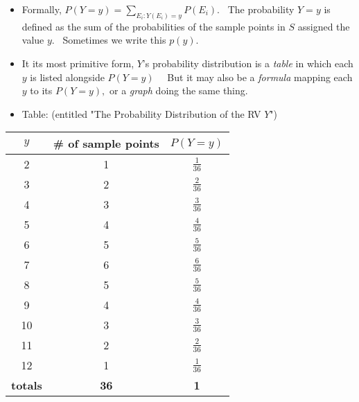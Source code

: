 \documentclass[11pt]{article}
\begin{document}
\begin{itemize}
\begin{itemize}
\begin{itemize}
\item Formally, $P(Y=y)=\sum_{E_{i}:Y(E_{i})=y}P(E_{i}).$ \ The probability $%
Y=y$ is defined as the sum of the probabilities of the sample points in $S$
assigned the value $y$. \ Sometimes we write this $p(y)$.

\item It its most primitive form, $Y$'s probability distribution is a 
\textit{table }in which each $y$ is listed alongside $P(Y=y)$ \ \ But it may
also be a \textit{formula} mapping each $y$ to its $P(Y=y),$ or a \textit{%
graph} doing the same thing.

\item Table: (entitled "The Probability Distribution of the RV $Y$")
\end{itemize}
\end{itemize}
\end{itemize}

\begin{center}
\begin{tabular}{ccl}
\hline\hline
$y$ & \# of sample points & $P(Y=y)$ \\ \hline
2 & 1 & \multicolumn{1}{c}{$\frac{1}{36}$} \\ 
3 & 2 & \multicolumn{1}{c}{$\frac{2}{36}$} \\ 
4 & 3 & \multicolumn{1}{c}{$\frac{3}{36}$} \\ 
5 & 4 & \multicolumn{1}{c}{$\frac{4}{36}$} \\ 
6 & 5 & \multicolumn{1}{c}{$\frac{5}{36}$} \\ 
7 & 6 & \multicolumn{1}{c}{$\frac{6}{36}$} \\ 
8 & 5 & \multicolumn{1}{c}{$\frac{5}{36}$} \\ 
9 & 4 & \multicolumn{1}{c}{$\frac{4}{36}$} \\ 
10 & 3 & \multicolumn{1}{c}{$\frac{3}{36}$} \\ 
11 & 2 & \multicolumn{1}{c}{$\frac{2}{36}$} \\ 
12 & 1 & \multicolumn{1}{c}{$\frac{1}{36}$} \\ \hline
\multicolumn{1}{l}{\textbf{totals}} & \textbf{36} & \multicolumn{1}{c}{%
\textbf{1}} \\ \hline\hline
\end{tabular}
\end{center}
\end{document}

